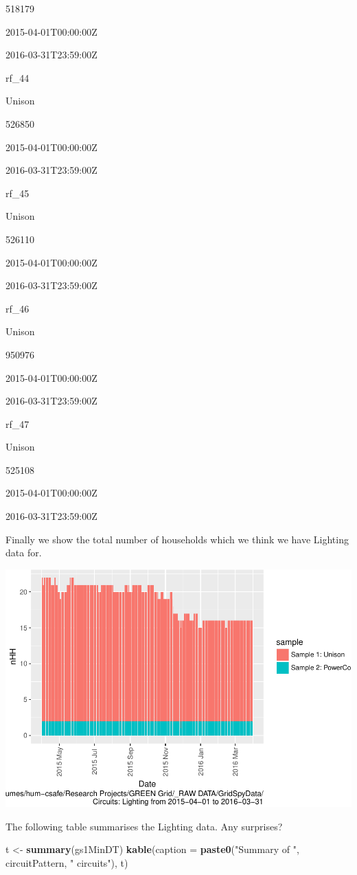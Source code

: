 \documentclass[]{article}
\newenvironment{Shaded}{\begin{snugshade}}{\end{snugshade}}
\newcommand{\KeywordTok}[1]{\textcolor[rgb]{0.13,0.29,0.53}{\textbf{#1}}}
\newcommand{\DataTypeTok}[1]{\textcolor[rgb]{0.13,0.29,0.53}{#1}}
\newcommand{\StringTok}[1]{\textcolor[rgb]{0.31,0.60,0.02}{#1}}
\newcommand{\NormalTok}[1]{#1}
\begin{document}
518179

2015-04-01T00:00:00Z

2016-03-31T23:59:00Z

rf\_44

Unison

526850

2015-04-01T00:00:00Z

2016-03-31T23:59:00Z

rf\_45

Unison

526110

2015-04-01T00:00:00Z

2016-03-31T23:59:00Z

rf\_46

Unison

950976

2015-04-01T00:00:00Z

2016-03-31T23:59:00Z

rf\_47

Unison

525108

2015-04-01T00:00:00Z

2016-03-31T23:59:00Z

Finally we show the total number of households which we think we have
Lighting data for.

\includegraphics{nzGGHouseholdPowerDemandProfile_Lighting_2015-04-01_2016-03-31_files/figure-latex/liveDataHouseholds-1.pdf}

The following table summarises the Lighting data. Any surprises?

\begin{Shaded}
\begin{Highlighting}[]
\NormalTok{t <-}\StringTok{ }\KeywordTok{summary}\NormalTok{(gs1MinDT)}
\KeywordTok{kable}\NormalTok{(}\DataTypeTok{caption =} \KeywordTok{paste0}\NormalTok{(}\StringTok{"Summary of "}\NormalTok{, circuitPattern, }\StringTok{" circuits"}\NormalTok{), t)}
\end{Highlighting}
\end{Shaded}
\end{document}
